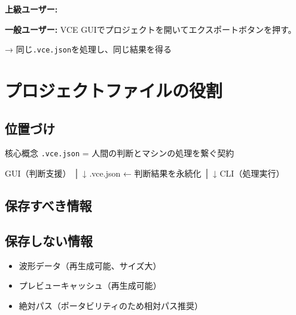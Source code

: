 \documentclass[10pt,a4paper,twocolumn]{ltjsarticle}
\begin{document}
\textbf{上級ユーザー:}

\textbf{一般ユーザー:}
VCE GUIでプロジェクトを開いてエクスポートボタンを押す。

→ 同じ\texttt{.vce.json}を処理し、同じ結果を得る

\section{プロジェクトファイルの役割}

\subsection{位置づけ}

\begin{itembox}[l]{核心概念}
\texttt{.vce.json} = 人間の判断とマシンの処理を繋ぐ契約
\end{itembox}

\begin{code}
GUI（判断支援）
    │
    ↓
.vce.json ← 判断結果を永続化
    │
    ↓
CLI（処理実行）
\end{code}

\subsection{保存すべき情報}

\vspace{0.5\baselineskip}
\vspace{0.5\baselineskip}

\subsection{保存しない情報}

\begin{itemize}
\item 波形データ（再生成可能、サイズ大）
\item プレビューキャッシュ（再生成可能）
\item 絶対パス（ポータビリティのため相対パス推奨）
\end{itemize}
\end{document}
